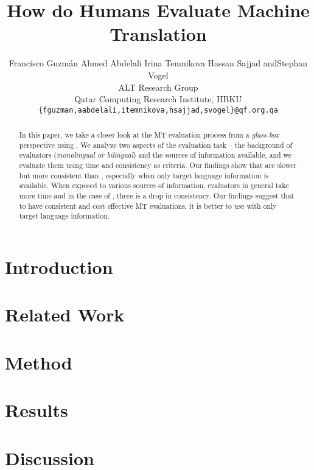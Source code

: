 \documentclass[11pt,a4paper]{article}
\title{How do Humans Evaluate Machine Translation}
\author{Francisco Guzm\'an\hspace*{1.5mm}
Ahmed Abdelali\hspace*{1.5mm}
Irina Temnikova\hspace*{1.5mm}
Hassan Sajjad\hspace*{1.5mm}
\hbox{\rm and}\hspace*{1.5mm}Stephan Vogel\\
ALT Research Group\\
Qatar Computing Research Institute, HBKU\\
{\tt\{fguzman,aabdelali,itemnikova,hsajjad,svogel\}@qf.org.qa}}
\date{}
\begin{document}
\maketitle
\begin{abstract}
In this paper, we take a closer look at the MT evaluation process from a \emph{glass-box} perspective using \eye. We analyze two aspects of the evaluation task -- the background of evaluators (\emph{monolingual or bilingual}) and the sources of information available, and we evaluate them using time  and consistency as criteria. %
Our findings show that \monos are slower but more consistent than \bils, especially when only target language information is available. 
When exposed to various sources of information, evaluators in general take more time and in the case of \monos, there is a drop in consistency.  Our findings suggest that to have consistent and cost effective MT evaluations, it is better to use \monos with only target language information.  

\end{abstract}

\section{Introduction}

\vspace{5pt}
\section{Related Work}
\vspace{5pt}


\section{Method}


\section{Results}


\pagebreak
\section{Discussion}


\end{document}
